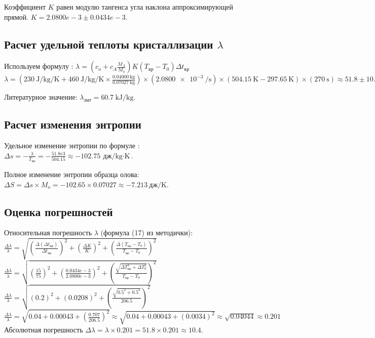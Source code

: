 \documentclass[a4paper]{article}
\begin{document}
Коэффициент $K$ равен модулю тангенса угла наклона аппроксимирующей прямой.
$K = {2.0800e-3 \pm 0.0434e-3}$.

\subsection{Расчет удельной теплоты кристаллизации $\lambda$}

Используем формулу :
$\lambda = (c_o + c_A \frac{M_A}{M_o}) K (T_{кр} - T_0) \Delta t_{кр}$
$\lambda = \left(\SI{230}{\joule\per\kilo\gram\per\kelvin} + \SI{460}{\joule\per\kilo\gram\per\kelvin} \times \frac{\SI{0.04000}{\kilo\gram}}{\SI{0.07027}{\kilo\gram}}\right) \times (\SI{2.0800e-3}{\per\second}) \times (\SI{504.15}{\kelvin} - \SI{297.65}{\kelvin}) \times (\SI{270}{\second})\approx 51.8 \pm 10.4$


Литературное значение: $\lambda_{лит} = \SI{60.7}{\kilo\joule\per\kilo\gram}$.

\subsection{Расчет изменения энтропии}

Удельное изменение энтропии по формуле :
$\Delta s = -\frac{\lambda}{T_{кр}} = -\frac{51.8e3}{504.15} \approx \SI{-102.75}{\text{дж}\per\kilo\gram\cdot\kelvin}$.

Полное изменение энтропии образца олова:
$\Delta S = \Delta s \times M_o = -102.65\times 0.07027 \approx \SI{-7.213}{\text{дж}\per\kelvin}$.

\subsection{Оценка погрешностей}

Относительная погрешность $\lambda$ (формула (17) из методички):
$\frac{\Delta \lambda}{\lambda} = \sqrt{ \left(\frac{\Delta (\Delta t_{кр})}{\Delta t_{кр}}\right)^2 + \left(\frac{\Delta K}{K}\right)^2 + \left(\frac{\Delta (T_{кр}-T_0)}{T_{кр}-T_0}\right)^2 }$
$\frac{\Delta \lambda}{\lambda} = \sqrt{ \left(\frac{15}{75}\right)^2 + \left(\frac{0.0434e-3}{2.0800e-3}\right)^2 + \left(\frac{\sqrt{\Delta T_{кр}^2 + \Delta T_0^2}}{T_{кр}-T_0}\right)^2 }$
$\frac{\Delta \lambda}{\lambda} = \sqrt{ (0.2)^2 + (0.0208)^2 + \left(\frac{\sqrt{0.5^2 + 0.5^2}}{206.5}\right)^2 }$
$\frac{\Delta \lambda}{\lambda} = \sqrt{ 0.04 + 0.00043 + (\frac{0.707}{206.5})^2 } \approx \sqrt{ 0.04 + 0.00043 + (0.0034)^2 } \approx \sqrt{0.04044} \approx 0.201$
Абсолютная погрешность $\Delta \lambda = \lambda \times 0.201 = 51.8\times 0.201 \approx 10.4$.
\end{document}
